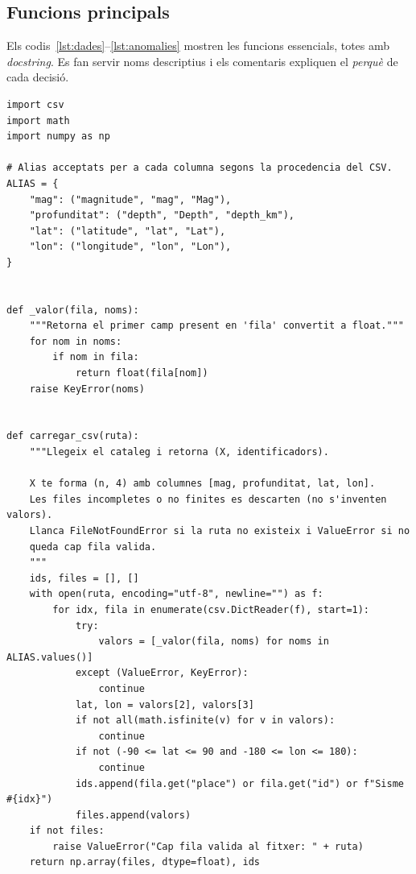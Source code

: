 \documentclass[11pt,a4paper]{article}
\begin{document}
\subsection{Funcions principals}
Els codis~\ref{lst:dades}--\ref{lst:anomalies} mostren les funcions
essencials, totes amb \textit{docstring}. Es fan servir noms descriptius i els
comentaris expliquen el \emph{perquè} de cada decisió.

\begin{lstlisting}[caption={Lectura i validacio de dades (\texttt{dades.py}).},label={lst:dades}]
import csv
import math
import numpy as np

# Alias acceptats per a cada columna segons la procedencia del CSV.
ALIAS = {
    "mag": ("magnitude", "mag", "Mag"),
    "profunditat": ("depth", "Depth", "depth_km"),
    "lat": ("latitude", "lat", "Lat"),
    "lon": ("longitude", "lon", "Lon"),
}


def _valor(fila, noms):
    """Retorna el primer camp present en 'fila' convertit a float."""
    for nom in noms:
        if nom in fila:
            return float(fila[nom])
    raise KeyError(noms)


def carregar_csv(ruta):
    """Llegeix el cataleg i retorna (X, identificadors).

    X te forma (n, 4) amb columnes [mag, profunditat, lat, lon].
    Les files incompletes o no finites es descarten (no s'inventen valors).
    Llanca FileNotFoundError si la ruta no existeix i ValueError si no
    queda cap fila valida.
    """
    ids, files = [], []
    with open(ruta, encoding="utf-8", newline="") as f:
        for idx, fila in enumerate(csv.DictReader(f), start=1):
            try:
                valors = [_valor(fila, noms) for noms in ALIAS.values()]
            except (ValueError, KeyError):
                continue
            lat, lon = valors[2], valors[3]
            if not all(math.isfinite(v) for v in valors):
                continue
            if not (-90 <= lat <= 90 and -180 <= lon <= 180):
                continue
            ids.append(fila.get("place") or fila.get("id") or f"Sisme #{idx}")
            files.append(valors)
    if not files:
        raise ValueError("Cap fila valida al fitxer: " + ruta)
    return np.array(files, dtype=float), ids
\end{lstlisting}
\end{document}
